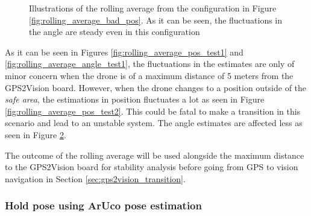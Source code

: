 \documentclass[../Head/report.tex]{subfiles}
\begin{document}
\begin{figure}[H]
\begin{subfigure}[t]{.30\textwidth}
        \caption{}
        \label{fig:rolling_average_in_yaw_test2}
    \end{subfigure}
    \caption{Illustrations of the rolling average from the configuration in Figure \ref{fig:rolling_average_bad_pos}. As it can be seen, the fluctuations in the angle are steady even in this configuration}
    \label{fig:rolling_average_angle_test2}
\end{figure}

As it can be seen in Figures \ref{fig:rolling_average_pos_test1} and \ref{fig:rolling_average_angle_test1}, the fluctuations in the estimates are only of minor concern when the drone is of a maximum distance of 5 meters from the GPS2Vision board. However, when the drone changes to a position outside of the \textit{safe area}, the estimations in position fluctuates a lot as seen in Figure \ref{fig:rolling_average_pos_test2}. This could be fatal to make a transition in this scenario and lead to an unstable system. The angle estimates are affected less as seen in Figure \ref{fig:rolling_average_angle_test2}.

The outcome of the rolling average will be used alongside the maximum distance to the GPS2Vision board for stability analysis before going from GPS to vision navigation in Section \ref{sec:gps2vision_transition}.  

\subsubsection{Hold pose using ArUco pose estimation}
\label{sec:hold_pose_using_aruco_pose_estimation}
\end{document}
